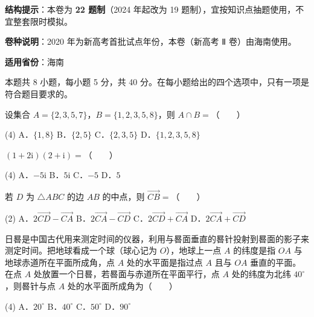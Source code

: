 

\begin{gknotice}
\textbf{结构提示}：本卷为 \textbf{22 题制}（2024 年起改为 19 题制），宜按知识点抽题使用，不宜整套限时模拟。

\textbf{卷种说明}：2020 年为新高考首批试点年份，本卷（新高考 Ⅱ 卷）由海南使用。

\textbf{适用省份}：海南
\end{gknotice}

\par\medskip


\begin{gktip}
本题共 8 小题，每小题 5 分，共 40 分。在每小题给出的四个选项中，只有一项是符合题目要求的。
\end{gktip}

设集合 $A=\{2,3,5,7\}$，$B=\{1,2,3,5,8\}$，则 $A\cap B=$（　　）

\begin{gkopts}(4)
\task A．$\{1,8\}$
\task B．$\{2,5\}$
\task C．$\{2,3,5\}$
\task D．$\{1,2,3,5,8\}$
\end{gkopts}

$(1+2\mathrm i)(2+\mathrm i)=$（　　）

\begin{gkopts}(4)
\task A．$-5\mathrm i$
\task B．$5\mathrm i$
\task C．$-5$
\task D．$5$
\end{gkopts}

若 $D$ 为 $\triangle ABC$ 的边 $AB$ 的中点，则 $\overrightarrow{CB}=$（　　）

\begin{gkopts}(2)
\task A．$2\overrightarrow{CD}-\overrightarrow{CA}$
\task B．$2\overrightarrow{CA}-\overrightarrow{CD}$
\task C．$2\overrightarrow{CD}+\overrightarrow{CA}$
\task D．$2\overrightarrow{CA}+\overrightarrow{CD}$
\end{gkopts}

日晷是中国古代用来测定时间的仪器，利用与晷面垂直的晷针投射到晷面的影子来测定时间。把地球看成一个球（球心记为 $O$），地球上一点 $A$ 的纬度是指 $OA$ 与地球赤道所在平面所成角，点 $A$ 处的水平面是指过点 $A$ 且与 $OA$ 垂直的平面。在点 $A$ 处放置一个日晷，若晷面与赤道所在平面平行，点 $A$ 处的纬度为北纬 $40^\circ$，则晷针与点 $A$ 处的水平面所成角为（　　）

\begin{gkopts}(4)
\task A．$20^\circ$
\task B．$40^\circ$
\task C．$50^\circ$
\task D．$90^\circ$
\end{gkopts}

